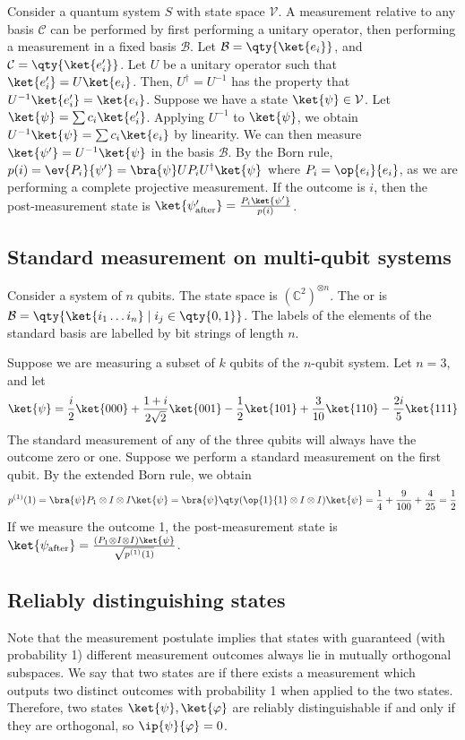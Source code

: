 Consider a quantum system $S$ with state space $\mathcal V$.
A measurement relative to any basis $\mathcal C$ can be performed by first performing a unitary operator, then performing a measurement in a fixed basis $\mathcal B$.
Let $\mathcal B = \qty{\ket{e_i}}$, and $\mathcal C = \qty{\ket{e_i'}}$.
Let $U$ be a unitary operator such that $\ket{e_i'} = U \ket{e_i}$.
Then, $U^\dagger = U^{-1}$ has the property that $U^{-1} \ket{e_i'} = \ket{e_i}$.
Suppose we have a state $\ket{\psi} \in \mathcal V$.
Let $\ket{\psi} = \sum c_i \ket{e_i'}$.
Applying $U^{-1}$ to $\ket{\psi}$, we obtain $U^{-1} \ket{\psi} = \sum c_i \ket{e_i}$ by linearity.
We can then measure $\ket{\psi'} = U^{-1} \ket{\psi}$ in the basis $\mathcal B$.
By the Born rule, $p(i) = \ev{P_i}{\psi'} = \bra{\psi} U P_i U^\dagger \ket{\psi}$ where $P_i = \op{e_i}{e_i}$, as we are performing a complete projective measurement.
If the outcome is $i$, then the post-measurement state is $\ket{\psi'_{\text{after}}} = \frac{P_i \ket{\psi'}}{p(i)}$.

\subsection{Standard measurement on multi-qubit systems}
Consider a system of $n$ qubits.
The state space is $(\mathbb C^2)^{\otimes n}$.
The  or  is $\mathcal B = \qty{\ket{i_1 \dots i_n} \mid i_j \in \qty{0,1}}$.
The labels of the elements of the standard basis are labelled by bit strings of length $n$.

Suppose we are measuring a subset of $k$ qubits of the $n$-qubit system.
Let $n = 3$, and let
\[ \ket{\psi} = \frac{i}{2} \ket{000} + \frac{1+i}{2\sqrt{2}} \ket{001} - \frac{1}{2} \ket{101} + \frac{3}{10} \ket{110} - \frac{2i}{5} \ket{111} \]
The standard measurement of any of the three qubits will always have the outcome zero or one.
Suppose we perform a standard measurement on the first qubit.
By the extended Born rule, we obtain
\[ p^{(1)}(1) = \bra{\psi} P_1 \otimes I \otimes I \ket{\psi} = \bra{\psi} \qty(\op{1}{1} \otimes I \otimes I) \ket{\psi} = \frac{1}{4} + \frac{9}{100} + \frac{4}{25} = \frac{1}{2} \]
If we measure the outcome 1, the post-measurement state is $\ket{\psi_{\text{after}}} = \frac{(P_1 \otimes I \otimes I)\ket{\psi}}{\sqrt{p^{(1)}(1)}}$.

\subsection{Reliably distinguishing states}
Note that the measurement postulate implies that states with guaranteed (with probability 1) different measurement outcomes always lie in mutually orthogonal subspaces.
We say that two states are  if there exists a measurement which outputs two distinct outcomes with probability 1 when applied to the two states.
Therefore, two states $\ket{\psi}, \ket{\varphi}$ are reliably distinguishable if and only if they are orthogonal, so $\ip{\psi}{\varphi} = 0$.

